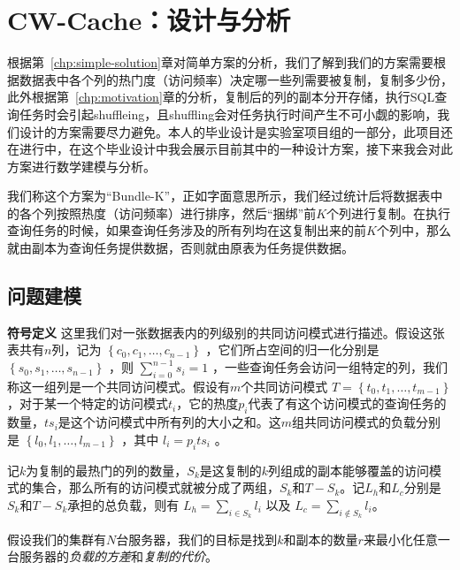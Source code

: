 \chapter{CW-Cache：设计与分析}
\label{chp:cw-cache}

\par 根据第~\ref{chp:simple-solution}章对简单方案的分析，我们了解到我们的方案需要根据数据表中各个列的热门度（访问频率）决定哪一些列需要被复制，复制多少份，此外根据第~\ref{chp:motivation}章的分析，复制后的列的副本分开存储，执行SQL查询任务时会引起shuffleing，且shuffling会对任务执行时间产生不可小觑的影响，我们设计的方案需要尽力避免。本人的毕业设计是实验室项目组的一部分，此项目还在进行中，在这个毕业设计中我会展示目前其中的一种设计方案，接下来我会对此方案进行数学建模与分析。

\par 我们称这个方案为“Bundle-K”，正如字面意思所示，我们经过统计后将数据表中的各个列按照热度（访问频率）进行排序，然后“捆绑”前$K$个列进行复制。在执行查询任务的时候，如果查询任务涉及的所有列均在这复制出来的前$K$个列中，那么就由副本为查询任务提供数据，否则就由原表为任务提供数据。

\section{问题建模}

\par \textbf{符号定义} \quad 这里我们对一张数据表内的列级别的共同访问模式进行描述。假设这张表共有$n$列，记为 $\left\{c_{0}, c_{1}, \dots, c_{n-1}\right\}$ ，它们所占空间的归一化分别是 $\left\{s_{0}, s_{1}, \dots, s_{n-1}\right\}$ ，则 $\sum_{i=0}^{n-1} s_i = 1$ ，一些查询任务会访问一组特定的列，我们称这一组列是一个共同访问模式。假设有$m$个共同访问模式 $T = \left\{t_{0}, t_{1}, \dots, t_{m-1}\right\}$ ，对于某一个特定的访问模式$t_i$，它的热度$p_i$代表了有这个访问模式的查询任务的数量，$ts_i$是这个访问模式中所有列的大小之和。这$m$组共同访问模式的负载分别是 $\left\{l_{0}, l_{1}, \dots, l_{m-1}\right\}$ ，其中 $l_i = p_i ts_i$ 。

\par 记$k$为复制的最热门的列的数量，$S_k$是这复制的$k$列组成的副本能够覆盖的访问模式的集合，那么所有的访问模式就被分成了两组，$S_k$和$T-S_k$。记$L_h$和$L_c$分别是$S_k$和$T-S_k$承担的总负载，则有 $L_h=\sum_{i \in S_{k}} l_{i}$ 以及 $ L_c = \sum_{i \notin S_{k}} l_{i}$。

\par 假设我们的集群有$N$台服务器，我们的目标是找到$k$和副本的数量$r$来最小化任意一台服务器的\emph{负载的方差}和\emph{复制的代价}。



